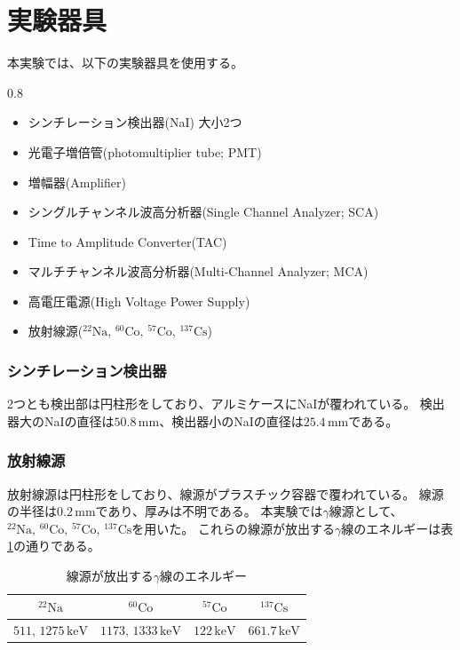 \documentclass[11pt, titlepage, openany]{ltjsbook}
\begin{document}
\section{実験器具}
本実験では、以下の実験器具を使用する。
\begin{center}
    \begin{varwidth}{0.8\textwidth}
        \begin{itemize}
            \item シンチレーション検出器(NaI) 大小2つ
            \item 光電子増倍管(photomultiplier tube; PMT)
            \item 増幅器(Amplifier)
            \item シングルチャンネル波高分析器(Single Channel Analyzer; SCA)
            \item Time to Amplitude Converter(TAC)
            \item マルチチャンネル波高分析器(Multi-Channel Analyzer; MCA)
            \item 高電圧電源(High Voltage Power Supply)
            \item 放射線源($\mathrm{^{22}Na,\,^{60}Co,\,^{57}Co,\,^{137}Cs}$)
        \end{itemize}
    \end{varwidth}
\end{center}
\subsubsection{シンチレーション検出器}
2つとも検出部は円柱形をしており、アルミケースにNaIが覆われている。
検出器大のNaIの直径は$50.8\,\mathrm{mm}$、検出器小のNaIの直径は$25.4\,\mathrm{mm}$である。
\subsubsection{放射線源}
放射線源は円柱形をしており、線源がプラスチック容器で覆われている。
線源の半径は$0.2\,\mathrm{mm}$であり、厚みは不明である。
本実験では$\gamma$線源として、$\mathrm{^{22}Na,\,^{60}Co,\,^{57}Co,\,^{137}Cs}$を用いた。
これらの線源が放出する$\gamma$線のエネルギーは表\ref{energy}の通りである。
\begin{table}[H]
    \centering
    \begin{tabular}{c|c|c|c}
        $^{22}\mathrm{Na}$ & $^{60}\mathrm{Co}$ & $^{57}\mathrm{Co}$ & $^{137}\mathrm{Cs}$ \\ \hline
        $511,\,1275\,\mathrm{keV}$ & $1173,\,1333\,\mathrm{keV}$ & $122\,\mathrm{keV}$ & $661.7\,\mathrm{keV}$
    \end{tabular}
    \caption{線源が放出する$\gamma$線のエネルギー}
    \label{energy}
\end{table}
\end{document}

